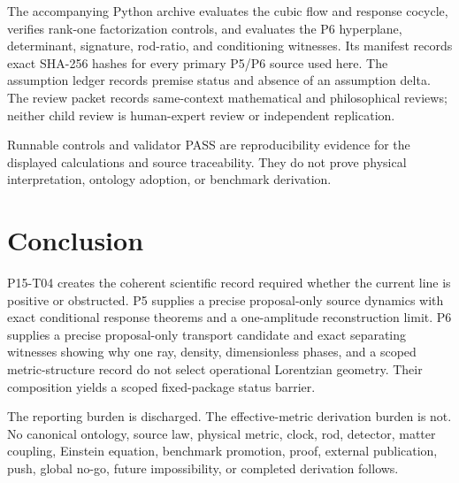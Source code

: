\documentclass[11pt]{article}
\begin{document}
The accompanying Python archive evaluates the cubic flow and response
cocycle, verifies rank-one factorization controls, and evaluates the P6
hyperplane, determinant, signature, rod-ratio, and conditioning witnesses.
Its manifest records exact SHA-256 hashes for every primary P5/P6 source used
here.  The assumption ledger records premise status and absence of an
assumption delta.  The review packet records same-context mathematical and
philosophical reviews; neither child review is human-expert review or
independent replication.

Runnable controls and validator PASS are reproducibility evidence for the
displayed calculations and source traceability.  They do not prove physical
interpretation, ontology adoption, or benchmark derivation.

\section{Conclusion}

P15-T04 creates the coherent scientific record required whether the current
line is positive or obstructed.  P5 supplies a precise proposal-only source
dynamics with exact conditional response theorems and a one-amplitude
reconstruction limit.  P6 supplies a precise proposal-only transport
candidate and exact separating witnesses showing why one ray, density,
dimensionless phases, and a scoped metric-structure record do not select
operational Lorentzian geometry.  Their composition yields a scoped
fixed-package status barrier.

The reporting burden is discharged.  The effective-metric derivation burden is not.
No canonical ontology, source law, physical metric, clock, rod,
detector, matter coupling, Einstein equation, benchmark promotion, proof,
external publication, push, global no-go, future impossibility, or completed
derivation follows.
\end{document}
